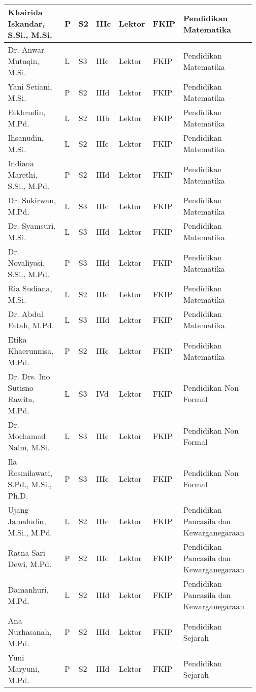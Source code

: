 \documentclass[
]{book}
\begin{document}
\begin{longtable}{l|l|l|l|l|l|l}
\hline
Khairida Iskandar, S.Si., M.Si. & P & S2 & IIIc & Lektor & FKIP & Pendidikan Matematika\\
\hline
Dr. Anwar Mutaqin, M.Si. & L & S3 & IIIc & Lektor & FKIP & Pendidikan Matematika\\
\hline
Yani Setiani, M.Si. & P & S2 & IIId & Lektor & FKIP & Pendidikan Matematika\\
\hline
Fakhrudin, M.Pd. & L & S2 & IIIb & Lektor & FKIP & Pendidikan Matematika\\
\hline
Ihsanudin, M.Si. & L & S2 & IIIc & Lektor & FKIP & Pendidikan Matematika\\
\hline
Indiana Marethi, S.Si., M.Pd. & P & S2 & IIId & Lektor & FKIP & Pendidikan Matematika\\
\hline
Dr. Sukirwan, M.Pd. & L & S3 & IIIc & Lektor & FKIP & Pendidikan Matematika\\
\hline
Dr. Syamsuri, M.Si. & L & S3 & IIId & Lektor & FKIP & Pendidikan Matematika\\
\hline
Dr. Novaliyosi, S.Si., M.Pd. & P & S3 & IIId & Lektor & FKIP & Pendidikan Matematika\\
\hline
Ria Sudiana, M.Si. & L & S2 & IIIc & Lektor & FKIP & Pendidikan Matematika\\
\hline
Dr. Abdul Fatah, M.Pd. & L & S3 & IIId & Lektor & FKIP & Pendidikan Matematika\\
\hline
Etika Khaerunnisa, M.Pd. & P & S2 & IIIc & Lektor & FKIP & Pendidikan Matematika\\
\hline
Dr. Drs. Ino Sutisno Rawita, M.Pd. & L & S3 & IVd & Lektor & FKIP & Pendidikan Non Formal\\
\hline
Dr. Mochamad Naim, M.Si. & L & S3 & IIIc & Lektor & FKIP & Pendidikan Non Formal\\
\hline
Ila Rosmilawati, S.Pd., M.Si., Ph.D. & P & S3 & IIIc & Lektor & FKIP & Pendidikan Non Formal\\
\hline
Ujang Jamaludin,  M.Si., M.Pd. & L & S2 & IIIc & Lektor & FKIP & Pendidikan Pancasila dan Kewarganegaraan\\
\hline
Ratna Sari Dewi, M.Pd. & P & S2 & IIIc & Lektor & FKIP & Pendidikan Pancasila dan Kewarganegaraan\\
\hline
Damanhuri, M.Pd. & L & S2 & IIId & Lektor & FKIP & Pendidikan Pancasila dan Kewarganegaraan\\
\hline
Ana Nurhasanah, M.Pd. & P & S2 & IIId & Lektor & FKIP & Pendidikan Sejarah\\
\hline
Yuni Maryuni, M.Pd. & P & S2 & IIId & Lektor & FKIP & Pendidikan Sejarah\\

\end{longtable}
\end{document}
